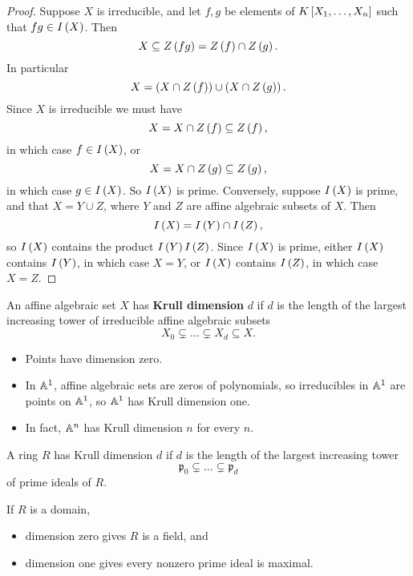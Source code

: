 \begin{proof}
Suppose $ X $ is irreducible, and let $ f, g $ be elements of $ K\sb{X_1, \dots, X_n} $ such that $ fg \in I\rb{X} $. Then
$$ X \subseteq Z\rb{fg} = Z\rb{f} \cap Z\rb{g}. $$
In particular
$$ X = \rb{X \cap Z\rb{f}} \cup \rb{X \cap Z\rb{g}}. $$
Since $ X $ is irreducible we must have
$$ X = X \cap Z\rb{f} \subseteq Z\rb{f}, $$
in which case $ f \in I\rb{X} $, or
$$ X = X \cap Z\rb{g} \subseteq Z\rb{g}, $$
in which case $ g \in I\rb{X} $. So $ I\rb{X} $ is prime. Conversely, suppose $ I\rb{X} $ is prime, and that $ X = Y \cup Z $, where $ Y $ and $ Z $ are affine algebraic subsets of $ X $. Then
$$ I\rb{X} = I\rb{Y} \cap I\rb{Z}, $$
so $ I\rb{X} $ contains the product $ I\rb{Y}I\rb{Z} $. Since $ I\rb{X} $ is prime, either $ I\rb{X} $ contains $ I\rb{Y} $, in which case $ X = Y $, or $ I\rb{X} $ contains $ I\rb{Z} $, in which case $ X = Z $.
\end{proof}

\begin{definition}
An affine algebraic set $ X $ has \textbf{Krull dimension} $ d $ if $ d $ is the length of the largest increasing tower of irreducible affine algebraic subsets
$$ X_0 \subsetneq \dots \subsetneq X_d \subseteq X. $$
\end{definition}

\begin{example2}
\hfill
\begin{itemize}
\item Points have dimension zero.
\item In $ \A^1 $, affine algebraic sets are zeros of polynomials, so irreducibles in $ \A^1 $ are points on $ \A^1 $, so $ \A^1 $ has Krull dimension one.
\item In fact, $ \A^n $ has Krull dimension $ n $ for every $ n $.
\end{itemize}
\end{example2}

\begin{definition}
A ring $ R $ has Krull dimension $ d $ if $ d $ is the length of the largest increasing tower
$$ \mathfrak{p}_0 \subsetneq \dots \subsetneq \mathfrak{p}_d $$
of prime ideals of $ R $.
\end{definition}

\begin{example2}
If $ R $ is a domain,
\begin{itemize}
\item dimension zero gives $ R $ is a field, and
\item dimension one gives every nonzero prime ideal is maximal.
\end{itemize}
\end{example2}

